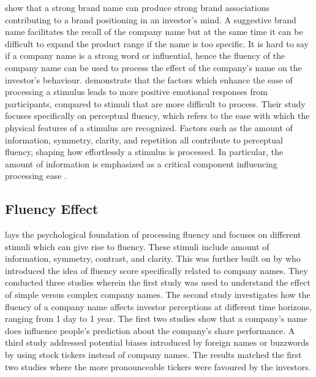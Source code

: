 \documentclass[a4paper,11pt]{report}
\begin{document}
 show that a strong brand name can produce strong brand associations contributing to a brand positioning in an investor's mind. A suggestive brand name facilitates the recall of the company name but at the same time it can be difficult to expand the product range if the name is too specific. It is hard to say if a company name is a strong word or influential, hence the fluency of the company name can be used to process the effect of the company's name on the investor's behaviour.  demonstrate that the factors which enhance the ease of processing a stimulus leads to more positive emotional responses from participants, compared to stimuli that are more difficult to process. Their study focuses specifically on perceptual fluency, which refers to the ease with which the physical features of a stimulus are recognized. Factors such as the amount of information, symmetry, clarity, and repetition all contribute to perceptual fluency, shaping how effortlessly a stimulus is processed. In particular, the amount of information is emphasized as a critical component influencing processing ease \cite{amtinfo2}. 

\subsection{Fluency Effect}
 lays the psychological foundation of processing fluency and focuses on different stimuli which can give rise to fluency. These stimuli include amount of information, symmetry, contrast, and clarity. This was further built on by  who introduced the idea of fluency score specifically related to company names. They conducted three studies wherein the first study was used to understand the effect of simple versus complex company names. The second study investigates how the fluency of a company name affects investor perceptions at different time horizons, ranging from 1 day to 1 year. The first two studies show that a company's name does influence people's prediction about the company's share performance. A third study addressed potential biases introduced by foreign names or buzzwords by using stock tickers instead of company names. The results matched the first two studies where the more pronounceable tickers were favoured by the investors.
\end{document}
